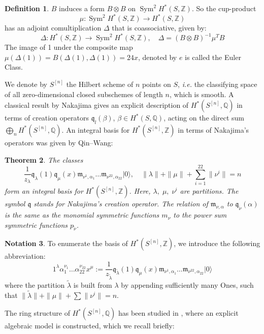\documentclass{amsart}
\DeclareMathOperator{\Sym}{Sym}
\newcommand{\hilb}[1]{^{[#1]}}
\newcommand{\ie}{{\it i.e. }}
\newcommand{\vac}{|0\rangle}
\newcommand{\IQ}{\mathbb{Q}}
\newcommand{\IZ}{\mathbb{Z}}
\newcommand{\km}{\mathfrak{m}}
\newcommand{\kq}{\mathfrak{q}}
\theoremstyle{plain}
\newtheorem{theorem}{Theorem}[section]
\theoremstyle{definition}
\newtheorem{definition}[theorem]{Definition}
\newtheorem{notation}[theorem]{Notation}
\theoremstyle{remark}
\begin{document}
\begin{definition}
$B$ induces a form $B\otimes B$ on $\Sym^2H^\ast(S,\IZ)$. So the cup-product 
\begin{equation*}
\mu : \Sym ^2H^{*}(S,\IZ) \longrightarrow H^\ast(S,\IZ) 
\end{equation*}
has an adjoint comultiplication $\Delta$ that is coassociative, given by:
\begin{equation*}
\Delta : H^\ast(S,\IZ) \longrightarrow \Sym^2H^\ast(S,\IZ),\quad \Delta = (B\otimes B)^{-1}\mu^TB
\end{equation*}
The image of 1 under the composite map $\mu(\Delta(1)) = B(\Delta(1),\Delta(1)) = 24 x$, denoted by $e$ is called the Euler Class.
\end{definition}
We denote by $S\hilb{n}$ the Hilbert scheme of $n$ points on $S$, \ie the classifying space of all zero-dimensional closed subschemes of length $n$, which is smooth. 
A classical result by Nakajima gives an explicit description of $H^\ast(S\hilb{n},\IQ)$ in terms of creation operators
$\kq_l(\beta)$, 
$\beta\in H^\ast(S,\IQ)$, acting on the direct sum 
$\bigoplus_n H^\ast(S\hilb{n},\IQ)$. 
An integral basis for $H^\ast(S\hilb{n},\IZ)$ in terms of Nakajima's operators was given by Qin--Wang:
\begin{theorem} \cite[Thm. 5.4.]{QinWang} The classes
$$ \frac{1}{z_\lambda} \kq_\lambda(1)\kq_\mu(x)\km_{\nu^1,\alpha_1}\ldots\km_{\nu^{22},\alpha_{22}}\vac,\quad \|\lambda\| +\|\mu\| + \sum_{i=1}^{22}\|\nu^i\| = n
$$ 
form an integral basis for $H^\ast(S\hilb{n},\IZ)$. Here,
$\lambda,\; \mu,\; \nu^i$ are partitions. The symbol $\kq$ stands for Nakajima's creation operator. 
The relation of $\km_{\nu,\alpha}$ to $\kq_{\tilde{\nu}}(\alpha)$ is the same as the monomial symmetric functions
$m_\nu$ to the power sum symmetric functions 
$p_{\tilde{\nu}}$.
\end{theorem}
\begin{notation}
To enumerate the basis of $H^\ast(S\hilb{n},\IZ)$, we introduce the following abbreviation:
$$ 
1^\lambda \alpha_1^{\nu_1}\ldots\alpha_{22}^{\nu_{22}}x^\mu :=
\frac{1}{z_{\tilde{\lambda}} }
\kq_{\tilde{\lambda}}(1)\kq_\mu(x)\km_{\nu^1,\alpha_1}\ldots\km_{\nu^{22},\alpha_{22}}\vac
$$
where the partition $\tilde{\lambda}$ is built from $\lambda$ by appending sufficiently many Ones, such that $\|\tilde{\lambda}\| +\|\mu\| + \sum\|\nu^i\| = n $.
\end{notation}
The ring structure of $H^\ast(S\hilb{n}, \IQ)$ has been studied in \cite{LehnSorger}, where an explicit algebraic model is constructed, which we recall briefly:
\end{document}
